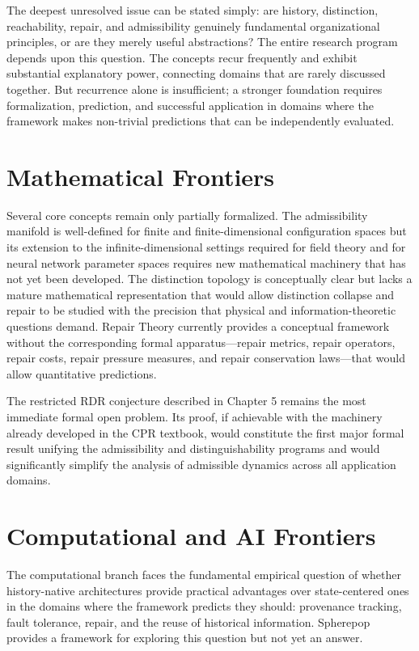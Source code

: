 \documentclass[11pt, oneside]{book}
\theoremstyle{definition}
\theoremstyle{remark}
\begin{document}
The deepest unresolved issue can be stated simply: are history, distinction, reachability, repair, and admissibility genuinely fundamental organizational principles, or are they merely useful abstractions? The entire research program depends upon this question. The concepts recur frequently and exhibit substantial explanatory power, connecting domains that are rarely discussed together. But recurrence alone is insufficient; a stronger foundation requires formalization, prediction, and successful application in domains where the framework makes non-trivial predictions that can be independently evaluated.

\section{Mathematical Frontiers}

Several core concepts remain only partially formalized. The admissibility manifold is well-defined for finite and finite-dimensional configuration spaces but its extension to the infinite-dimensional settings required for field theory and for neural network parameter spaces requires new mathematical machinery that has not yet been developed. The distinction topology is conceptually clear but lacks a mature mathematical representation that would allow distinction collapse and repair to be studied with the precision that physical and information-theoretic questions demand. Repair Theory currently provides a conceptual framework without the corresponding formal apparatus—repair metrics, repair operators, repair costs, repair pressure measures, and repair conservation laws—that would allow quantitative predictions.

The restricted RDR conjecture described in Chapter 5 remains the most immediate formal open problem. Its proof, if achievable with the machinery already developed in the CPR textbook, would constitute the first major formal result unifying the admissibility and distinguishability programs and would significantly simplify the analysis of admissible dynamics across all application domains.

\section{Computational and AI Frontiers}

The computational branch faces the fundamental empirical question of whether history-native architectures provide practical advantages over state-centered ones in the domains where the framework predicts they should: provenance tracking, fault tolerance, repair, and the reuse of historical information. Spherepop provides a framework for exploring this question but not yet an answer.
\end{document}
